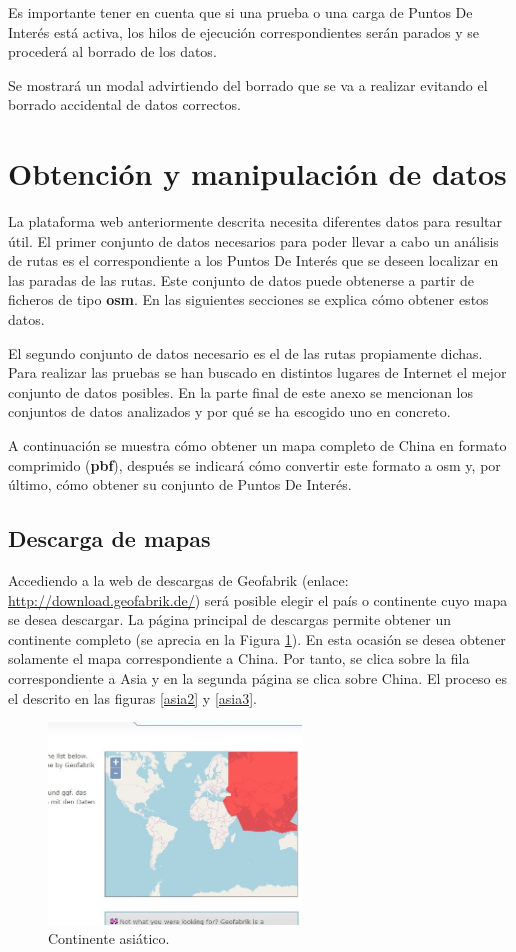 Es importante tener en cuenta que si una prueba o una carga de Puntos De Interés está activa, los hilos de ejecución correspondientes serán parados y se procederá al borrado de los datos.

Se mostrará un modal advirtiendo del borrado que se va a realizar evitando el borrado accidental de datos correctos.


\section{Obtención y manipulación de datos}
La plataforma web anteriormente descrita necesita diferentes datos para resultar útil. El primer conjunto de datos necesarios para poder llevar a cabo un análisis de rutas es el correspondiente a los Puntos De Interés que se deseen localizar en las paradas de las rutas. Este conjunto de datos puede obtenerse a partir de ficheros de tipo \textbf{osm}. En las siguientes secciones se explica cómo obtener estos datos.

El segundo conjunto de datos necesario es el de las rutas propiamente dichas. Para realizar las pruebas se han buscado en distintos lugares de Internet el mejor conjunto de datos posibles. En la parte final de este anexo se mencionan los conjuntos de datos analizados y por qué se ha escogido uno en concreto.

A continuación se muestra cómo obtener un mapa completo de China en formato comprimido (\textbf{pbf}), después se indicará cómo convertir este formato a osm y, por último, cómo obtener su conjunto de Puntos De Interés.

\subsection{Descarga de mapas}
Accediendo a la web de descargas de Geofabrik (enlace: \url{http://download.geofabrik.de/}) será posible elegir el país o continente cuyo mapa se desea descargar. La página principal de descargas permite obtener un continente completo (se aprecia en la Figura \ref{asia1}). En esta ocasión se desea obtener solamente el mapa correspondiente a China. Por tanto, se clica sobre la fila correspondiente a Asia y en la segunda página se clica sobre China. El proceso es el descrito en las figuras \ref{asia2} y \ref{asia3}.

\begin{figure}[h]
  \centering
    \includegraphics[width=0.6\textwidth]{../img/manualusuario/asia1.jpg}
  \caption{Continente asiático.}
  \label{asia1}
\end{figure}

